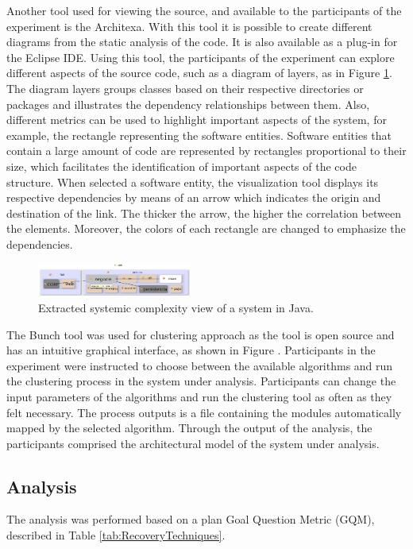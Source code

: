 \documentclass{sig-alternate-05-2015}
\begin{document}
Another tool used for viewing the source, and available to the participants of the experiment is the Architexa. With this tool it is possible to create different diagrams from the static analysis of the code. It is also available as a plug-in for the Eclipse IDE. Using this tool, the participants of the experiment can explore different aspects of the source code, such as a diagram of layers, as in Figure \ref{diagrama_architex}. The diagram layers groups classes based on their respective directories or packages and illustrates the dependency relationships between them. Also, different metrics can be used to highlight important aspects of the system, for example, the rectangle representing the software entities. Software entities that contain a large amount of code are represented by rectangles proportional to their size, which facilitates the identification of important aspects of the code structure. When selected a software entity, the visualization tool displays its respective dependencies by means of an arrow which indicates the origin and destination of the link. The thicker the arrow, the higher the correlation between the elements. Moreover, the colors of each rectangle are changed to emphasize the dependencies.


\begin{figure}[!h]
	\centering
	\includegraphics[width=0.45\textwidth]{6_diagrama_architex_2}
	\caption{Extracted systemic complexity view of a system in Java.}
	\label{diagrama_architex}
\end{figure}


The Bunch tool \cite{mitchell_heuristic_2002} was used for clustering approach as the tool is open source and has an intuitive graphical interface, as shown in Figure . Participants in the experiment were instructed to choose between the available algorithms and run the clustering process in the system under analysis. Participants can change the input parameters of the algorithms and run the clustering tool as often as they felt necessary. The process outputs is a file containing the modules automatically mapped by the selected algorithm. Through the output of the analysis, the participants comprised the architectural model of the system under analysis.

\subsection{Analysis}%
The analysis was performed based on a plan Goal Question Metric (GQM), described in Table \ref{tab:RecoveryTechniques}.
\end{document}
